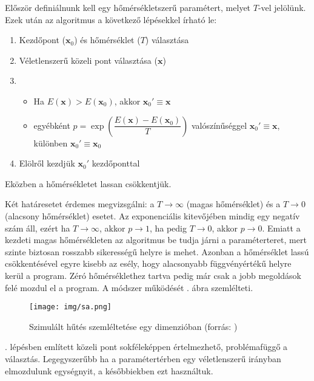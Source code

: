 \documentclass[12pt]{article}
\begin{document}
Először definiálnunk kell egy hőmérsékletszerű paramétert, melyet $T$-vel jelölünk. Ezek után az algoritmus a következő lépésekkel írható le:
\begin{enumerate} %
	\item Kezdőpont ($\mathbf{x}_0$) és hőmérséklet ($T$) választása
	\item Véletlenszerű közeli pont választása ($\mathbf{x}$) \label{veletlen_kozeli_pont}
	\item \begin{itemize} %
		\item Ha $E(\mathbf{x}) > E(\mathbf{x}_0) $, akkor $\mathbf{x}_0' \equiv \mathbf{x}$
		\item egyébként $\displaystyle p = \exp\left(\dfrac{E(\mathbf{x}) - E(\mathbf{x}_0)}{T}\right)$ valószínűséggel $\mathbf{x}_0' \equiv \mathbf{x}$, különben $\mathbf{x}_0' \equiv \mathbf{x}_0$
	\end{itemize}
	\item Elölről kezdjük $\mathbf{x}_0'$ kezdőponttal
\end{enumerate} %
Eközben a hőmérsékletet lassan csökkentjük.

Két határesetet érdemes megvizsgálni: a $T \rightarrow \infty$ (magas hőmérséklet) és a $T \rightarrow 0$ (alacsony hőmérséklet) esetet. Az exponenciális kitevőjében mindig egy negatív szám áll, ezért ha $T \rightarrow \infty$, akkor $p \rightarrow 1$, ha pedig $T \rightarrow 0$, akkor $p \rightarrow 0$.
Emiatt a kezdeti magas hőmérsékleten az algoritmus be tudja járni a paraméterteret, mert szinte biztosan rosszabb sikerességű helyre is mehet. Azonban a hőmérséklet lassú csökkentésével egyre kisebb az esély, hogy alacsonyabb függvényértékű helyre kerül a program. Zéró hőmérséklethez tartva pedig már csak a jobb megoldások felé mozdul el a program. A módszer működését . ábra szemlélteti.
\begin{figure}[H]
	\centering
	\texttt{[image: img/sa.png]}
	\caption{Szimulált hűtés szemléltetése egy dimenzióban (forrás: \cite{simulated_annealing_fig})}
	\label{fig:simulated_annealing_szemleltetes}
\end{figure}

. lépésben említett közeli pont sokféleképpen értelmezhető, problémafüggő a választás. Legegyszerűbb ha a paramétertérben egy véletlenszerű irányban elmozdulunk egységnyit, a későbbiekben ezt használtuk.
\end{document}
